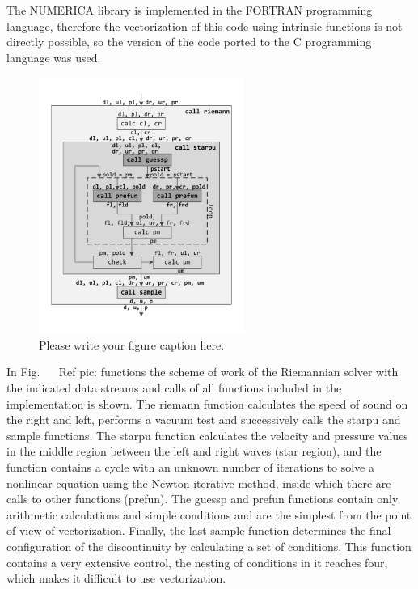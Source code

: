 \documentclass[
11pt,%
tightenlines,%
twoside,%
onecolumn,%
nofloats,%
nobibnotes,%
nofootinbib,%
superscriptaddress,%
noshowpacs,%
centertags]%
{revtex4}
\begin{document}
The NUMERICA library is implemented in the FORTRAN programming language, therefore the vectorization of this code using intrinsic functions is not directly possible, so the version of the code ported to the C programming language was used.

\begin{figure}[h]
\setcaptionmargin{5mm}
\onelinecaptionstrue  %
\includegraphics[width=0.6\textwidth]{pics/riemann.pdf}
\caption{Please write your figure caption here.}\label{fig:1}
\end{figure}

In Fig. ~ \ Ref {pic: functions} the scheme of work of the Riemannian solver with the indicated data streams and calls of all functions included in the implementation is shown. The riemann function calculates the speed of sound on the right and left, performs a vacuum test and successively calls the starpu and sample functions. The starpu function calculates the velocity and pressure values ​​in the middle region between the left and right waves (star region), and the function contains a cycle with an unknown number of iterations to solve a nonlinear equation using the Newton iterative method, inside which there are calls to other functions (prefun). The guessp and prefun functions contain only arithmetic calculations and simple conditions and are the simplest from the point of view of vectorization. Finally, the last sample function determines the final configuration of the discontinuity by calculating a set of conditions. This function contains a very extensive control, the nesting of conditions in it reaches four, which makes it difficult to use vectorization.
\end{document}
